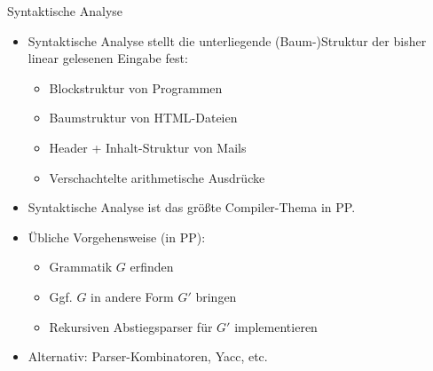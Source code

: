 \documentclass{beamer}
\begin{document}
\begin{frame}{Syntaktische Analyse}
	\begin{itemize}
                \item Syntaktische Analyse stellt die unterliegende (Baum-)Struktur der bisher linear gelesenen Eingabe fest:
		\begin{itemize}
			\item Blockstruktur von Programmen
			\item Baumstruktur von HTML-Dateien
			\item Header + Inhalt-Struktur von Mails
			\item Verschachtelte arithmetische Ausdrücke
		\end{itemize}
		\item Syntaktische Analyse ist das größte Compiler-Thema in PP.
		\pause
		\item Übliche Vorgehensweise (in PP):
		\begin{itemize}
			\item Grammatik $G$ erfinden
			\item Ggf. $G$ in andere Form $G'$ bringen
			\item Rekursiven Abstiegsparser für $G'$ implementieren
		\end{itemize}
		\item Alternativ: Parser-Kombinatoren, Yacc, etc.
	\end{itemize}
\end{frame}
\end{document}
